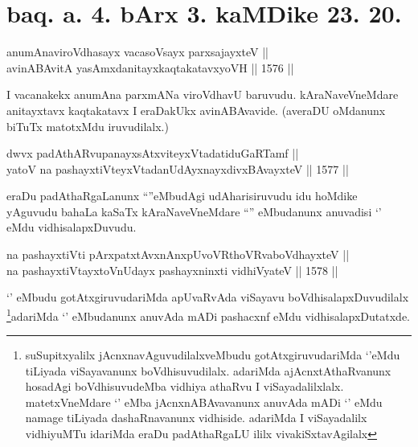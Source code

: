 \section*{baq. a. 4. bArx 3. kaMDike 23. 20.}

\begin{shl}
anumAnaviroVdhasayx vacasoV\s sayx parxsajayxteV || \\
avinABAvitA yasAmxdanitayxkaqtakatavxyoVH ||  1576 || 
\end{shl}

\begin{artha}
I vacanakekx anumAna parxmANa viroVdhavU baruvudu. kAraNaveVneMdare anitayxtavx kaqtakatavx I eraDakUkx avinABAvavide. (averaDU oMdanunx biTuTx matotxMdu iruvudilalx.)
\end{artha}


\begin{shl}
dwvx padAthARvupanayxsAtxviteyxVtadatiduGaRTamf || \\
yatoV na pashayxtiVteyxVtadanUdAyxnayxdivxBAvayxteV ||  1577 ||  
\end{shl}

\begin{artha}
eraDu padAthaRgaLanunx ``\stext''eMbudAgi udAharisiruvudu idu hoMdike yAguvudu bahaLa kaSaTx kAraNaveVneMdare ``\stext'' eMbudanunx anuvadisi `\stext' eMdu vidhisalapxDuvudu.
\end{artha}


\begin{shl}
na pashayxtiVti pArxpatxtAvxnAnxpUvoVR\s thoVR\s vaboVdhayxteV ||  \\
na pashayxtiVtayxtoV\s nUdayx pashayxninxti vidhiVyateV ||  1578 ||  
\end{shl}

\begin{artha}
`\stext' eMbudu gotAtxgiruvudariMda apUvaRvAda viSayavu boVdhisalapxDuvudilalx \footnote{suSupitxyalilx jAcnxnavAguvudilalxveMbudu gotAtxgiruvudariMda `\stext'eMdu tiLiyada viSayavanunx boVdhisuvudilalx. adariMda ajAcnxtAthaRvanunx hosadAgi boVdhisuvudeMba vidhiya athaRvu I viSayadalilxlalx. matetxVneMdare `\stext' eMba jAcnxnABAvavanunx anuvAda mADi `\stext' eMdu namage tiLiyada dashaRnavanunx vidhiside. adariMda I viSayadalilx vidhiyuMTu idariMda eraDu padAthaRgaLU ililx vivakiSxtavAgilalx}adariMda `\stext' eMbudanunx anuvAda mADi pashacxnf eMdu vidhisalapxDutatxde.
\end{artha}

